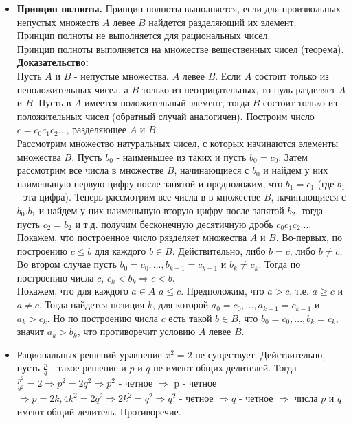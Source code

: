 \documentclass[12pt,a4paper]{article}
\begin{document}
\begin{itemize}
\item \textbf{Принцип полноты. }
Принцип полноты выполняется, если для произвольных непустых множеств $A$ левее $B$ найдется разделяющий их элемент. \\
Принцип полноты не выполняется для рациональных чисел. \\
Принцип полноты выполняется на множестве вещественных чисел (теорема).\\
\textbf{Доказательство:} \\
Пусть $A$ и $B$ - непустые множества.  $A$ левее $B$. Если $A$ состоит только из неположительных чисел, а $B$ только из неотрицательных, то нуль разделяет $A$ и $B$. Пусть в $A$ имеется положительный элемент, тогда $B$ состоит только из положительных чисел (обратный случай аналогичен). Построим число $c = c_0c_1c_2...$, разделяющее $A$ и $B$. \\
Рассмотрим множество натуральных чисел, с которых начинаются элементы множества $B$. Пусть $b_0$ - наименьшее из таких и пусть $b_0 = c_0$. Затем рассмотрим все числа в множестве $B$, начинающиеся с $b_0$ и найдем у них наименьшую первую цифру после запятой и предположим, что $b_1=c_1$ (где $b_1$ - эта цифра). Теперь рассмотрим все числа в в множестве $B$, начинающиеся с $b_0.b_1$ и найдем у них наименьшую вторую цифру после запятой $b_2$, тогда пусть $c_2=b_2$  и т.д. получим бесконечную десятичную дробь $c_0c_1c_2...$. Покажем, что построенное число рязделяет множества $A$ и $B$. Во-первых, по построению $c \leq b$ для каждого $b \in B$. Действительно, либо $b = c$, либо $b \neq c$. Во втором случае пусть $b_0 = c_0, ..., b_{k-1} = c_{k-1}$ и $b_k \neq c_k$. Тогда по построению числа $c$, $c_k < b_k \Rightarrow c < b$. \\
Покажем, что для каждого $a \in A $ $a \leq c$. Предположим, что $a > c$, т.е. $a \geq c$ и $a \neq c$. Тогда найдется позиция $k$, для которой $a_0=c_0, ..., a_{k-1}=c_{k-1}$ и $a_k > c_k$. Но по построению числа $c$ есть такой $b \in B$, что $b_0 = c_0, ..., b_k=c_k$, значит $a_k > b_k$, что противоречит условию $A$ левее $B$. 

\item Рациональных решений уравнение $x^2=2$ не существует. Действительно, пусть $\frac{p}{q}$ - такое решение и $p$ и $q$ не имеют общих делителей. Тогда $\frac{p^2}{q^2} = 2 \Rightarrow p^2=2q^2 \Rightarrow p^2$ - четное $\Rightarrow$ p - четное $\Rightarrow p=2k, 4k^2=2q^2 \Rightarrow 2k^2 = q^2 \Rightarrow q^2$ - четное $\Rightarrow q$ - четное $\Rightarrow$ числа $p$ и $q$ имеют общий делитель. Противоречие.


\end{itemize}
\end{document}
